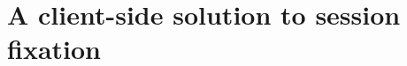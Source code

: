 \chapter{A client-side solution to session fixation}\label{fixation-solution}

\label{detecting-sids}
